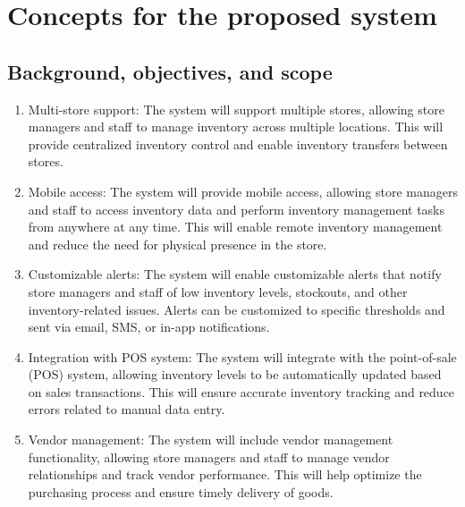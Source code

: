\chapter{Concepts for the proposed system \\ 
\label{Chapter::Conceptsfortheproposedsystem}} 
\section{Background, objectives, and scope \label{Section::Backgroundobjectivesandscope}}
\begin{enumerate}
    
    \item Multi-store support: The system will support multiple stores, allowing store managers and staff to manage inventory across multiple locations. This will provide centralized inventory control and enable inventory transfers between stores.

    \item Mobile access: The system will provide mobile access, allowing store managers and staff to access inventory data and perform inventory management tasks from anywhere at any time. This will enable remote inventory management and reduce the need for physical presence in the store.

    \item Customizable alerts: The system will enable customizable alerts that notify store managers and staff of low inventory levels, stockouts, and other inventory-related issues. Alerts can be customized to specific thresholds and sent via email, SMS, or in-app notifications.

    \item Integration with POS system: The system will integrate with the point-of-sale (POS) system, allowing inventory levels to be automatically updated based on sales transactions. This will ensure accurate inventory tracking and reduce errors related to manual data entry.

    \item Vendor management: The system will include vendor management functionality, allowing store managers and staff to manage vendor relationships and track vendor performance. This will help optimize the purchasing process and ensure timely delivery of goods.

\end{enumerate}

